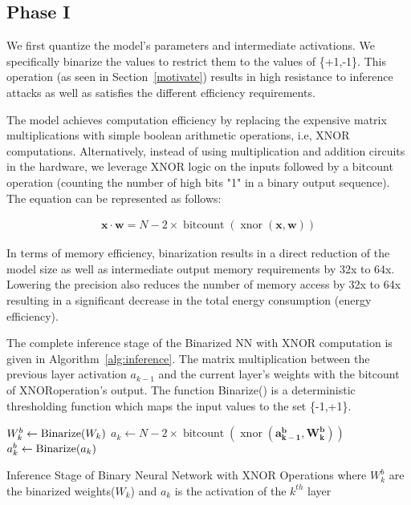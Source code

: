 \subsection{Phase I}

We first quantize the model's parameters and intermediate activations. We specifically binarize the values to restrict them to the values of \{+1,-1\}.
This operation (as seen in Section~\ref{motivate}) results in high resistance to inference attacks as well as satisfies the different efficiency requirements.

The model achieves computation efficiency by replacing the expensive matrix multiplications with simple boolean arithmetic operations, i.e, XNOR computations.
Alternatively, instead of using multiplication and addition circuits in the hardware, we leverage XNOR logic on the inputs followed by a bitcount operation (counting the number of high bits "1" in a binary output sequence).
The equation can be represented as follows:

\begin{align}
\mathbf{x} \cdot \mathbf{w} =
N - 2\times\operatorname{bitcount}(\operatorname{xnor}(\mathbf{x}, \mathbf{w}))
\end{align}

In terms of memory efficiency, binarization results in a direct reduction of the model size as well as intermediate output memory requirements by 32x to 64x.
Lowering the precision also reduces the number of memory access by 32x to 64x resulting in a significant decrease in the total energy consumption (energy efficiency).


The complete inference stage of the Binarized NN with XNOR computation is given in Algorithm~\ref{alg:inference}.
The matrix multiplication between the previous layer activation $a_{k-1}$ and the current layer's weights with the bitcount of XNORoperation's output.
The function Binarize() is a deterministic thresholding function which maps the input values to the set \{-1,+1\}.

\begin{algorithm}
\begin{algorithmic}
        \STATE $W_k^b \leftarrow {\rm Binarize}(W_k)$
        \STATE $a_k \leftarrow N - 2\times\operatorname{bitcount}(\operatorname{xnor}(\mathbf{a_{k-1}^b}, \mathbf{W_k^b}))$
            \STATE $a_k^b \leftarrow {\rm Binarize}(a_k)$
        \ENDIF
    \ENDFOR
\end{algorithmic}
\caption{Inference Stage of Binary Neural Network with XNOR Operations where $W_k^b$ are the binarized weights($W_k$) and $a_k$ is the activation of the $k^{th}$ layer}
\label{alg:inference}
\end{algorithm}



